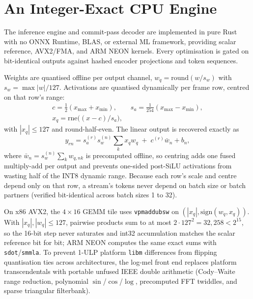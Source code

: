 \section{An Integer-Exact CPU Engine}\label{sec:engine}

The inference engine and commit-pass decoder are implemented in pure Rust with no ONNX Runtime,
BLAS, or external ML framework, providing scalar reference, AVX2/FMA, and ARM NEON kernels. Every
optimisation is gated on bit-identical outputs against hashed encoder projections and token
sequences.

 Weights are quantised offline per output channel,
$w_q = \mathrm{round}(w/s_w)$ with $s_w = \max|w|/127$. Activations are quantised dynamically per
frame row, centred on that row's range:
\begin{equation}
\begin{gathered}
c = \tfrac{1}{2}(x_{\max}+x_{\min}),\qquad s_a = \tfrac{1}{254}(x_{\max}-x_{\min}),\\
x_q = \mathrm{rne}\bigl((x-c)/s_a\bigr),
\end{gathered}
\end{equation}
with $|x_q|\le 127$ and round-half-even. The linear output is recovered exactly as
\begin{equation}
y_{rn} = s_a^{(r)} s_w^{(n)} \textstyle\sum_k x_q w_q \;+\; c^{(r)} \bar w_n + b_n,
\end{equation}
where $\bar w_n = s_w^{(n)}\sum_k w_{q,nk}$ is precomputed offline, so centring adds one fused
multiply-add per output and prevents one-sided post-SiLU activations from wasting half of the INT8
dynamic range. Because each row's scale and centre depend only on that row, a stream's tokens never
depend on batch size or batch partners (verified bit-identical across batch sizes 1 to 32).

 On x86 AVX2, the $4\times 16$ GEMM tile uses
\texttt{vpmaddubsw} on $(|x_q|, \mathrm{sign}(w_q, x_q))$. With $|x_q|,|w_q|\le 127$, pairwise
products sum to at most $2\cdot 127^2 = 32{,}258 < 2^{15}$, so the 16-bit step never saturates and
int32 accumulation matches the scalar reference bit for bit; ARM NEON computes the same exact sums
with \texttt{sdot}/\texttt{smmla}. To prevent 1-ULP platform \texttt{libm} differences from
flipping quantisation ties across architectures, the log-mel front end replaces platform
transcendentals with portable unfused IEEE double arithmetic (Cody--Waite range reduction,
polynomial $\sin$/$\cos$/$\log$, precomputed FFT twiddles, and sparse triangular filterbank).

